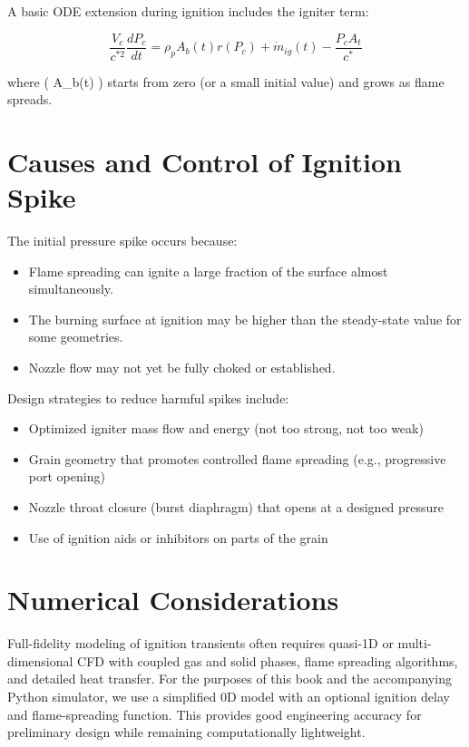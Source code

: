 \documentclass[
  letterpaper,
  DIV=11,
  numbers=noendperiod]{scrreprt}
\providecommand{\tightlist}{%
  \setlength{\itemsep}{0pt}\setlength{\parskip}{0pt}}
\begin{document}
A basic ODE extension during ignition includes the igniter term:

\[
\frac{V_c}{c^{*2}} \frac{dP_c}{dt} = \rho_p A_b(t) r(P_c) + \dot{m}_{ig}(t) - \frac{P_c A_t}{c^*}
\]

where ( A\_b(t) ) starts from zero (or a small initial value) and grows
as flame spreads.

\section{Causes and Control of Ignition
Spike}\label{causes-and-control-of-ignition-spike}

The initial pressure spike occurs because:

\begin{itemize}
\tightlist
\item
  Flame spreading can ignite a large fraction of the surface almost
  simultaneously.
\item
  The burning surface at ignition may be higher than the steady-state
  value for some geometries.
\item
  Nozzle flow may not yet be fully choked or established.
\end{itemize}

Design strategies to reduce harmful spikes include:

\begin{itemize}
\tightlist
\item
  Optimized igniter mass flow and energy (not too strong, not too weak)
\item
  Grain geometry that promotes controlled flame spreading (e.g.,
  progressive port opening)
\item
  Nozzle throat closure (burst diaphragm) that opens at a designed
  pressure
\item
  Use of ignition aids or inhibitors on parts of the grain
\end{itemize}

\section{Numerical Considerations}\label{numerical-considerations}

Full-fidelity modeling of ignition transients often requires quasi-1D or
multi-dimensional CFD with coupled gas and solid phases, flame spreading
algorithms, and detailed heat transfer. For the purposes of this book
and the accompanying Python simulator, we use a simplified 0D model with
an optional ignition delay and flame-spreading function. This provides
good engineering accuracy for preliminary design while remaining
computationally lightweight.
\end{document}
